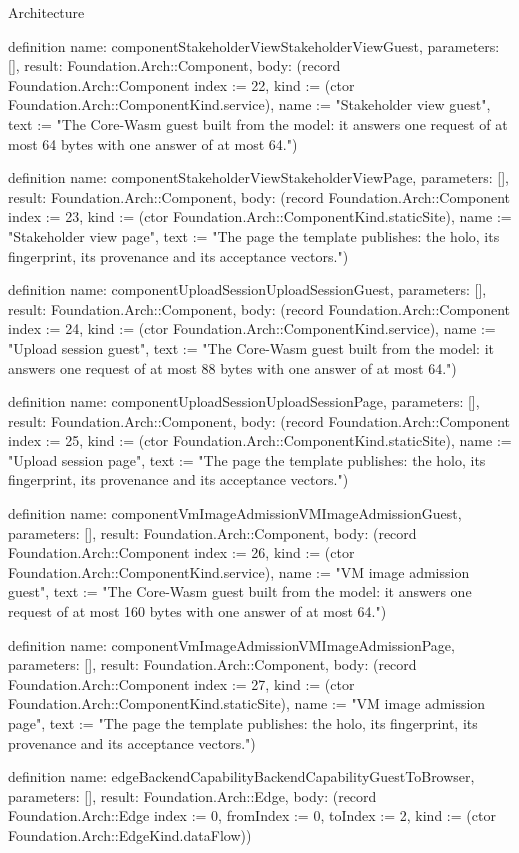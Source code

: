 \begin{lexlean}{Architecture}
\begin{semanticmodule}
definition{
  name: componentStakeholderViewStakeholderViewGuest,
  parameters: [],
  result: Foundation.Arch::Component,
  body: (record Foundation.Arch::Component {index := 22, kind := (ctor Foundation.Arch::ComponentKind.service), name := "Stakeholder view guest", text := "The Core-Wasm guest built from the model: it answers one request of at most 64 bytes with one answer of at most 64."})
}

definition{
  name: componentStakeholderViewStakeholderViewPage,
  parameters: [],
  result: Foundation.Arch::Component,
  body: (record Foundation.Arch::Component {index := 23, kind := (ctor Foundation.Arch::ComponentKind.staticSite), name := "Stakeholder view page", text := "The page the template publishes: the holo, its fingerprint, its provenance and its acceptance vectors."})
}

definition{
  name: componentUploadSessionUploadSessionGuest,
  parameters: [],
  result: Foundation.Arch::Component,
  body: (record Foundation.Arch::Component {index := 24, kind := (ctor Foundation.Arch::ComponentKind.service), name := "Upload session guest", text := "The Core-Wasm guest built from the model: it answers one request of at most 88 bytes with one answer of at most 64."})
}

definition{
  name: componentUploadSessionUploadSessionPage,
  parameters: [],
  result: Foundation.Arch::Component,
  body: (record Foundation.Arch::Component {index := 25, kind := (ctor Foundation.Arch::ComponentKind.staticSite), name := "Upload session page", text := "The page the template publishes: the holo, its fingerprint, its provenance and its acceptance vectors."})
}

definition{
  name: componentVmImageAdmissionVMImageAdmissionGuest,
  parameters: [],
  result: Foundation.Arch::Component,
  body: (record Foundation.Arch::Component {index := 26, kind := (ctor Foundation.Arch::ComponentKind.service), name := "VM image admission guest", text := "The Core-Wasm guest built from the model: it answers one request of at most 160 bytes with one answer of at most 64."})
}

definition{
  name: componentVmImageAdmissionVMImageAdmissionPage,
  parameters: [],
  result: Foundation.Arch::Component,
  body: (record Foundation.Arch::Component {index := 27, kind := (ctor Foundation.Arch::ComponentKind.staticSite), name := "VM image admission page", text := "The page the template publishes: the holo, its fingerprint, its provenance and its acceptance vectors."})
}

definition{
  name: edgeBackendCapabilityBackendCapabilityGuestToBrowser,
  parameters: [],
  result: Foundation.Arch::Edge,
  body: (record Foundation.Arch::Edge {index := 0, fromIndex := 0, toIndex := 2, kind := (ctor Foundation.Arch::EdgeKind.dataFlow)})
}


\end{semanticmodule}
\end{lexlean}

